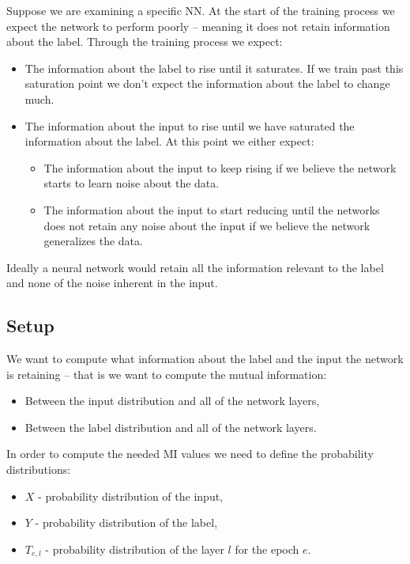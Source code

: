 \documentclass[dissertation.tex]{subfiles}
\begin{document}
Suppose we are examining a specific NN. At the start of the training process we
expect the network to perform poorly -- meaning it does not retain information
about the label. Through the training process we expect: 
\begin{itemize}
  \item{
      The information about the label to rise until it saturates. If we train
      past this saturation point we don't expect the information about the label
      to change much.
    }
  \item{
      The information about the input to rise until we have saturated the
      information about the label. At this point we either expect:
      \begin{itemize}
        \item{
            The information about the input to keep rising if we believe the
            network starts to learn noise about the data.
          }
        \item{
            The information about the input to start reducing until the networks
            does not retain any noise about the input if we believe the network
            generalizes the data.
          }
      \end{itemize}
    }
\end{itemize}

Ideally a neural network would retain all the information relevant to the label
and none of the noise inherent in the input.

\subsection{Setup}
\label{subIPsetup}

We want to compute what information about the label and the input the network is
retaining -- that is we want to compute the mutual information:
\begin{itemize}
  \item{
      Between the input distribution and all of the network layers,
    }
  \item{
      Between the label distribution and all of the network layers.
    }
\end{itemize}

In order to compute the needed MI values we need to define the probability
distributions:
\begin{itemize}
  \item{
      $X$ - probability distribution of the input,
    }
  \item{
      $Y$ - probability distribution of the label,
    }
  \item{
      $T_{e,l}$ - probability distribution of the layer $l$ for the epoch $e$.
    }
\end{itemize}
\end{document}
